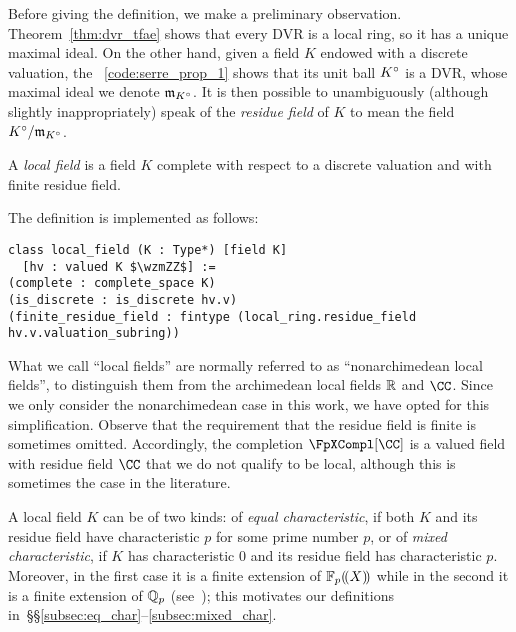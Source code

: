 \documentclass[sigplan,10pt,anonymous,review]{acmart}
\begin{document}
Before giving the definition, we make a preliminary observation. Theorem~\ref{thm:dvr_tfae} shows that every DVR is a local ring, so it has a unique maximal ideal. On the other hand, given a field $K$ endowed with a discrete valuation, the \LClistingname~\ref{code:serre_prop_1} shows that its unit ball $\ball{K}$ is a DVR, whose maximal ideal we denote $\maxid[\ball{K}]$. It is then possible to unambiguously (although slightly inappropriately) speak of the \emph{residue field} of $K$ to mean the field $\ball{K}/\maxid[\ball{K}]$.

\begin{definition}\label{def:local_field}
A \emph{local field} is a field $K$ complete with respect to a discrete valuation and with finite residue field.
\end{definition}
The definition is implemented as follows:\href{https://github.com/LCFT-Lean/local_fields/blob/76ad487d09babdb0018f394a5634526637ee014a/src/local_field.lean#L30}{\extlink}
\begin{lstlisting}
class local_field (K : Type*) [field K] 
  [hv : valued K $\wzmZZ$] :=
(complete : complete_space K)
(is_discrete : is_discrete hv.v)
(finite_residue_field : fintype (local_ring.residue_field hv.v.valuation_subring))
\end{lstlisting}

\begin{remark}
What we call ``local fields'' are normally referred to as ``nonarchimedean local fields'', to distinguish them from the archimedean local fields $\RR$ and $\CC$. Since we only consider the nonarchimedean case in this work, we have opted for this simplification. Observe that the requirement that the residue field is finite is sometimes omitted. Accordingly, the completion $\FpXCompl[\CC]$ is a valued field with residue field $\CC$ that we do not qualify to be local, although this is sometimes the case in the literature.
\end{remark}

A local field $K$ can be of two kinds: of \emph{equal characteristic}, if both $K$ and its residue field have characteristic $p$ for some prime number $p$, or of \emph{mixed characteristic}, if $K$ has characteristic $0$ and its residue field has characteristic $p$. Moreover, in the first case it is a finite extension of $\laurentseries$ while in the second it is a finite extension of $\QQ_p$ (see~\cite[Chapitre~VI,~\S9, n$^\circ$3]{Bou85}); this motivates our definitions in~\S\S\ref{subsec:eq_char}--\ref{subsec:mixed_char}.
\end{document}
